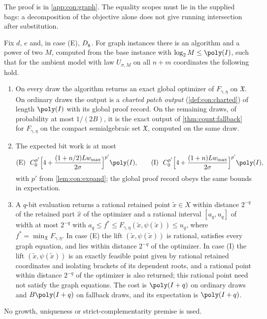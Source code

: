 The proof is in \cref{app:con:graph}. The equality scopes must lie in the
supplied bags: a decomposition of the objective alone does not give running
intersection after substitution.

\begin{theorem}\label{thm:con:graph}
Fix $d$, $e$ and, in case (E), $D_{\rm g}$. For graph instances there is an
algorithm and a power of two $M$, computed from the base instance with
$\log_2M\le\poly(I)$, such that for the ambient model with law $U_{\sigma,M}$
on all $n+m$ coordinates the following hold.
\begin{enumerate}[label=(\roman*)]
\item On every draw the algorithm returns an exact global optimizer of
$F_{\gamma,\eta}$ on $\mathfrak X$. On ordinary draws the output is a
\emph{charted patch output} (\cref{def:con:charted}) of length $\poly(I)$
with its global proof record. On the remaining draws, of probability at most
$1/(2B)$, it is the exact output of \cref{thm:count:fallback} for
$F_{\gamma,\eta}$ on the compact semialgebraic set $\mathfrak X$, computed on
the same draw.
\item The expected bit work is at most
\[
 \text{(E)}\ \ C_0^{p'}\Bigl[4+\frac{(1+n/2)Lw_{\max}}{2\sigma}\Bigr]^{p'}\poly(I),
 \qquad
 \text{(I)}\ \ C_0^{p'}\Bigl[4+\frac{(1+n)Lw_{\max}}{2\sigma}\Bigr]^{p'}\poly(I),
\]
with $p'$ from \cref{lem:con:expand}; the global proof record obeys the same
bounds in expectation.
\item A $q$-bit evaluation returns a rational retained point $\tilde x\in X$
within distance $2^{-q}$ of the retained part $\hat x$ of the optimizer and
a rational interval $[a_q,u_q]$ of width at most $2^{-q}$ with
$a_q\le f^*\le F_{\gamma,\eta}(\tilde x,\psi(\tilde x))\le u_q$, where
$f^*=\min_{\mathfrak X}F_{\gamma,\eta}$.
In case (E) the lift $(\tilde x,\psi(\tilde x))$ is rational, satisfies every
graph equation, and lies within distance $2^{-q}$ of the optimizer. In case
(I) the lift $(\tilde x,\psi(\tilde x))$ is an exactly feasible point given
by rational retained coordinates and isolating brackets of its dependent
roots, and a rational point within distance $2^{-q}$ of the optimizer is
also returned; this rational point need not satisfy the graph equations. The
cost is $\poly(I+q)$ on ordinary draws and $B\poly(I+q)$ on fallback draws,
and its expectation is $\poly(I+q)$.
\end{enumerate}
No growth, uniqueness or strict-complementarity premise is used.
\end{theorem}

